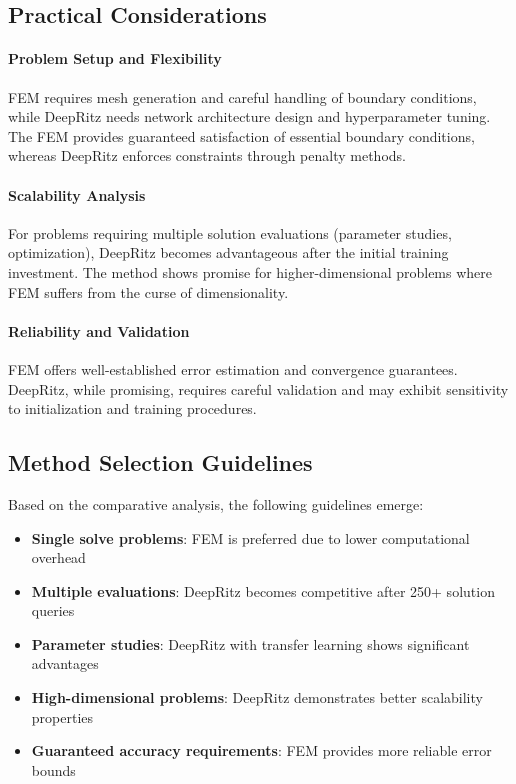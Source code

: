 \subsection{Practical Considerations}

\paragraph{Problem Setup and Flexibility}
FEM requires mesh generation and careful handling of boundary conditions, while DeepRitz needs network architecture design and hyperparameter tuning. The FEM provides guaranteed satisfaction of essential boundary conditions, whereas DeepRitz enforces constraints through penalty methods.

\paragraph{Scalability Analysis}
For problems requiring multiple solution evaluations (parameter studies, optimization), DeepRitz becomes advantageous after the initial training investment. The method shows promise for higher-dimensional problems where FEM suffers from the curse of dimensionality.

\paragraph{Reliability and Validation}
FEM offers well-established error estimation and convergence guarantees. DeepRitz, while promising, requires careful validation and may exhibit sensitivity to initialization and training procedures.

\subsection{Method Selection Guidelines}

Based on the comparative analysis, the following guidelines emerge:

\begin{itemize}
    \item \textbf{Single solve problems}: FEM is preferred due to lower computational overhead
    \item \textbf{Multiple evaluations}: DeepRitz becomes competitive after 250+ solution queries
    \item \textbf{Parameter studies}: DeepRitz with transfer learning shows significant advantages
    \item \textbf{High-dimensional problems}: DeepRitz demonstrates better scalability properties
    \item \textbf{Guaranteed accuracy requirements}: FEM provides more reliable error bounds
\end{itemize}


